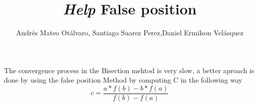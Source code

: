 \documentclass{article}
\title{\textit{Help} False position }
\author{Andrés Mateo Otálvaro, Santiago Suarez Perez,Daniel Ermilson Velásquez}
\begin{document}
\maketitle
The convergence process in the Bisection mehtod is very slow, a better aproach is done by using the false position Method by computing C in the following way \\
\begin{equation}
c=\frac{a*f(b)-b*f(a)}{f(b)-f(a)}
\end{equation}
\end{document}
